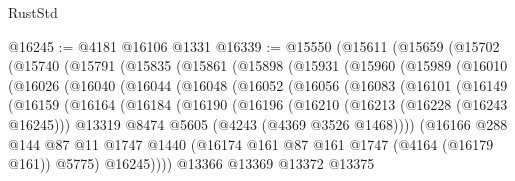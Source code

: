 \begin{lexlean}{RustStd}
\begin{coremodule}
@16245 := @4181 @16106 @1331
@16339 := @15550
    (@15611
      (@15659
        (@15702
          (@15740
            (@15791
              (@15835
                (@15861
                  (@15898
                    (@15931
                      (@15960
                        (@15989
                          (@16010
                            (@16026
                              (@16040
                                (@16044
                                  (@16048
                                    (@16052
                                      (@16056
                                        (@16083
                                          (@16101
                                            (@16149
                                              (@16159
                                                (@16164
                                                  (@16184
                                                    (@16190
                                                      (@16196
                                                        (@16210
                                                          (@16213 (@16228 (@16243 @16245)))
                                                          @13319
                                                          @8474
                                                          @5605
                                                          (@4243 (@4369 @3526 @1468))))
                                                      (@16166
                                                        @288
                                                        @144
                                                        @87
                                                        @11
                                                        @1747
                                                        @1440
                                                        (@16174
                                                          @161
                                                          @87
                                                          @161
                                                          @1747
                                                          (@4164 (@16179 @161))
                                                          @5775)
                                                        @16245))))
                                                @13366
                                                @13369
                                                @13372
                                                @13375

\end{coremodule}
\end{lexlean}
